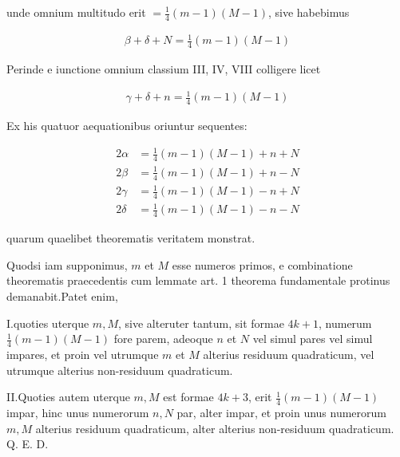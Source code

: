 unde omnium multitudo erit $=\frac14(m-1)(M-1)$, sive habebimus

\[
\begin{aligned}
\beta+\delta+N=\tfrac14(m-1)(M-1)
\end{aligned}
\]

Perinde e iunctione omnium classium III, IV, VIII colligere licet

\[
\begin{aligned}
\gamma+\delta+n=\tfrac14(m-1)(M-1)
\end{aligned}
\]

Ex his quatuor aequationibus oriuntur sequentes:

\[
\begin{aligned}
2\alpha&=\tfrac14(m-1)(M-1)+n+N\\
2\beta&=\tfrac14(m-1)(M-1)+n-N\\
2\gamma&=\tfrac14(m-1)(M-1)-n+N\\
2\delta&=\tfrac14(m-1)(M-1)-n-N
\end{aligned}
\]

quarum quaelibet theorematis veritatem monstrat.


Quodsi iam supponimus, $m$ et $M$ esse numeros primos, e combinatione theorematis praecedentis cum lemmate art. 1 theorema fundamentale protinus demanabit.\quad Patet enim,

I.\quad quoties uterque $m,M$, sive alteruter tantum, sit formae $4k+1$, numerum $\frac14(m-1)(M-1)$ fore parem, adeoque $n$ et $N$ vel simul pares vel simul impares, et proin vel utrumque $m$ et $M$ alterius residuum quadraticum, vel utrumque alterius non-residuum quadraticum.

II.\quad Quoties autem uterque $m,M$ est formae $4k+3$, erit $\frac14(m-1)(M-1)$ impar, hinc unus numerorum $n,N$ par, alter impar, et proin unus numerorum $m,M$ alterius residuum quadraticum, alter alterius non-residuum quadraticum. Q. E. D.

